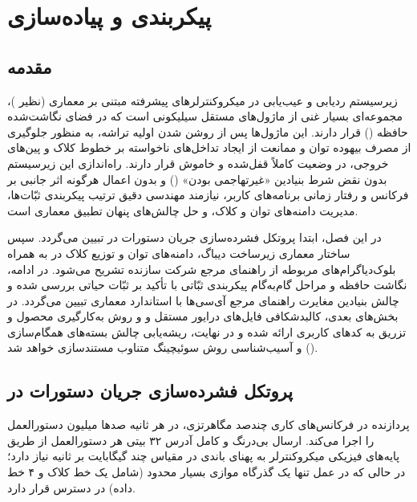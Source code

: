 
\chapter{پیکربندی  و پیاده‌سازی }
\label{ch:firmware}

\section{مقدمه}
زیرسیستم ردیابی و عیب‌یابی  در میکروکنترلرهای پیشرفته مبتنی بر معماری  (نظیر )، مجموعه‌ای بسیار غنی از ماژول‌های مستقل سیلیکونی است که در فضای نگاشت‌شده حافظه () قرار دارند. این ماژول‌ها پس از روشن شدن اولیه تراشه، به منظور جلوگیری از مصرف بیهوده توان و ممانعت از ایجاد تداخل‌های ناخواسته بر خطوط کلاک و پین‌های خروجی، در وضعیت کاملاً قفل‌شده و خاموش قرار دارند. راه‌اندازی این زیرسیستم بدون نقض شرط بنیادین «غیرتهاجمی بودن» () و بدون اعمال هرگونه اثر جانبی بر فرکانس و رفتار زمانی برنامه‌های کاربر، نیازمند مهندسی دقیق ترتیب پیکربندی ثبّات‌ها، مدیریت دامنه‌های توان و کلاک، و حل چالش‌های پنهان تطبیق معماری است.

در این فصل، ابتدا پروتکل فشرده‌سازی جریان دستورات در  تبیین می‌گردد. سپس ساختار معماری زیرساخت دیباگ، دامنه‌های توان و توزیع کلاک در  به همراه بلوک‌دیاگرام‌های مربوطه از راهنمای مرجع شرکت سازنده تشریح می‌شود. در ادامه، نگاشت حافظه و مراحل گام‌به‌گام پیکربندی ثبّاتی با تأکید بر ثبّات حیاتی  بررسی شده و چالش بنیادین مغایرت راهنمای مرجع آی‌سی‌ها با استاندارد معماری  تبیین می‌گردد. در بخش‌های بعدی، کالبدشکافی فایل‌های درایور مستقل  و  و روش به‌کارگیری محصول و تزریق به کدهای کاربری ارائه شده و در نهایت، ریشه‌یابی چالش بسته‌های همگام‌سازی () و آسیب‌شناسی روش سوئیچینگ متناوب مستندسازی خواهد شد.

\section{پروتکل فشرده‌سازی جریان دستورات در }
\label{sec:etm_compression_protocol}
پردازنده  در فرکانس‌های کاری چندصد مگاهرتزی، در هر ثانیه صدها میلیون دستورالعمل را اجرا می‌کند. ارسال بی‌درنگ و کامل آدرس ۳۲ بیتی هر دستورالعمل از طریق پایه‌های فیزیکی میکروکنترلر به پهنای باندی در مقیاس چند گیگابایت بر ثانیه نیاز دارد؛ در حالی که در عمل تنها یک گذرگاه موازی بسیار محدود (شامل یک خط کلاک و ۴ خط داده) در دسترس قرار دارد.

